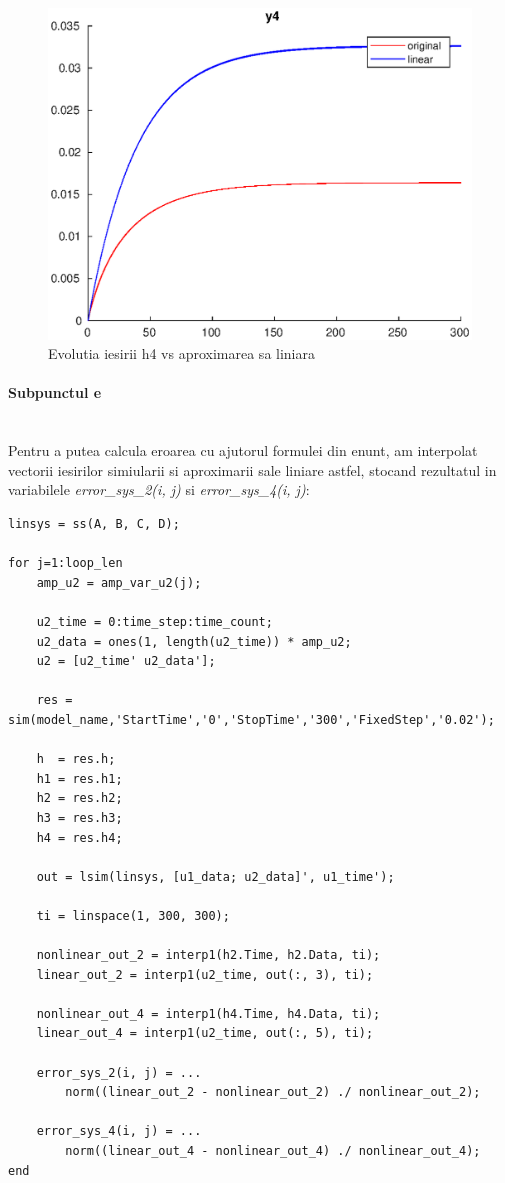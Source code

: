 \documentclass[12pt,english]{article}
\newcommand{\myparagraph}[1]{\paragraph{#1}\mbox{}\\}
\begin{document}
\begin{figure} [H]
	\includegraphics[width=1\textwidth]{d_2.eps}
	\caption{Evolutia iesirii h4 vs aproximarea sa liniara}
\end{figure}

\myparagraph {Subpunctul e}
Pentru a putea calcula eroarea cu ajutorul formulei din enunt, am interpolat vectorii iesirilor simiularii si aproximarii sale liniare astfel, stocand rezultatul in variabilele \textit{error\_sys\_2(i, j)} si \textit{error\_sys\_4(i, j)}:

\begin{verbatim}
linsys = ss(A, B, C, D);

for j=1:loop_len
	amp_u2 = amp_var_u2(j);

	u2_time = 0:time_step:time_count;
	u2_data = ones(1, length(u2_time)) * amp_u2;
	u2 = [u2_time' u2_data'];

	res = sim(model_name,'StartTime','0','StopTime','300','FixedStep','0.02');

	h  = res.h;
	h1 = res.h1;
	h2 = res.h2;
	h3 = res.h3;
	h4 = res.h4;

	out = lsim(linsys, [u1_data; u2_data]', u1_time');

	ti = linspace(1, 300, 300);

	nonlinear_out_2 = interp1(h2.Time, h2.Data, ti);
	linear_out_2 = interp1(u2_time, out(:, 3), ti);

	nonlinear_out_4 = interp1(h4.Time, h4.Data, ti);
	linear_out_4 = interp1(u2_time, out(:, 5), ti);

	error_sys_2(i, j) = ...
		norm((linear_out_2 - nonlinear_out_2) ./ nonlinear_out_2);
	
	error_sys_4(i, j) = ...
		norm((linear_out_4 - nonlinear_out_4) ./ nonlinear_out_4);
end
\end{verbatim}
\end{document}
